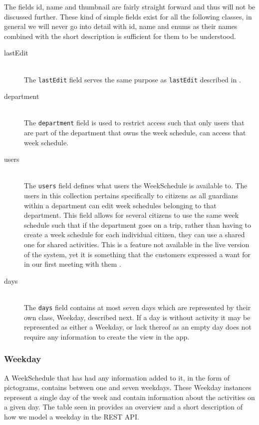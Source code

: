 \noindent
The fields id, name and thumbnail are fairly straight forward and thus will not be discussed further.
These kind of simple fields exist for all the following classes, in general we will never go into detail with id, name and enums as their names combined with the short description is sufficient for them to be understood.
\begin{description}
    \item [lastEdit] \hfill \\ 
    The \texttt{lastEdit} field serves the same purpose as \texttt{lastEdit} described in .
    \item [department] \hfill \\
    The \texttt{department} field is used to restrict access such that only users that are part of the department that owns the week schedule, can access that week schedule.
    \item [users] \hfill \\
    The \texttt{users} field defines what users the WeekSchedule is available to.
    The users in this collection pertains specifically to citizens as all guardians within a department can edit week schedules belonging to that department.
    This field allows for several citizens to use the same week schedule such that if the department goes on a trip, rather than having to create a week schedule for each individual citizen, they can use a shared one for shared activities.
    This is a feature not available in the live version of the system, yet it is something that the customers expressed a want for in our first meeting with them \citep{GIRAF20161stMeeting}.
    \item [days] \hfill \\
    The \texttt{days} field contains at most seven days which are represented by their own class, Weekday, described next.
    If a day is without activity it may be represented as either a Weekday, or lack thereof as an empty day does not require any information to create the view in the app.
\end{description}

\subsubsection{Weekday}
A WeekSchedule that has had any information added to it, in the form of pictograms, contains between one and seven weekdays.
These Weekday instances represent a single day of the week and contain information about the activities on a given day.
The table seen in  provides an overview and a short description of how we model a weekday in the REST API.

